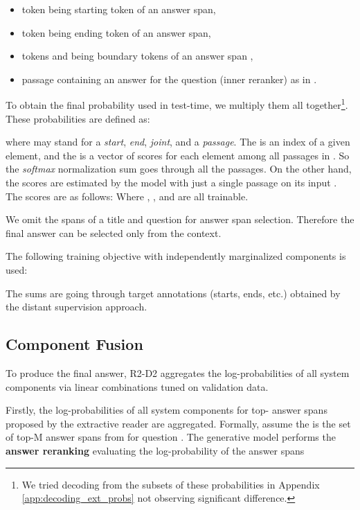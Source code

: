 \documentclass[11pt,a4paper]{article}
\begin{document}
\begin{itemize}
    \setlength\parskip{0em}
    \item token  being starting token of an answer span,
    \item token  being ending token of an answer span,
    \item tokens  and  being boundary tokens of an answer span \cite{fajcik2020rethinking},
    \item passage  containing an answer for the question  (inner reranker) as in \citet{karpukhin2020dense}.
\end{itemize}



To obtain the final probability used in test-time, we multiply them all together\footnote{We tried decoding from the subsets of these probabilities in Appendix \ref{app:decoding_ext_probs} not observing significant difference.}. These probabilities are defined as:

where  may stand for a \emph{start}, \emph{end}, \emph{joint}, and a \emph{passage}. The  is an index of a given element, and the  is a vector of scores for each element among all passages in . So the \emph{softmax} normalization sum goes through all the passages. On the other hand, the  scores are estimated by the model with just a single passage on its input \cite{clark-gardner-2018-simple}. The scores are as follows:
\setlength{\jot}{1ex}
Where , , and  are all trainable.

We omit the spans of a title and question for answer span selection. Therefore the final answer can be selected only from the context.

The following training objective with independently marginalized components is used:


The sums are going through target annotations (starts, ends, etc.) obtained by the distant supervision approach.











\subsection{Component Fusion}
\label{ss:fusions}
To produce the final answer, R2-D2 aggregates the log-probabilities of all system components via linear combinations tuned on validation data.  

Firstly, the log-probabilities of all system components for top- answer spans proposed by the extractive reader are aggregated. Formally, assume the  is the set of top-M answer spans from  for question .
The generative model performs  the \textbf{answer reranking} evaluating the log-probability of the answer spans 
\end{document}
